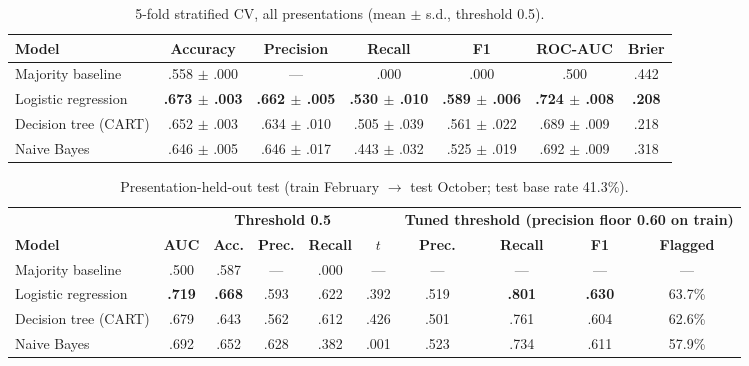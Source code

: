 \documentclass[10pt,letterpaper]{article}
\begin{document}
\begin{table}[H]\centering\small
\caption{5-fold stratified CV, all presentations (mean $\pm$ s.d., threshold 0.5).}\label{tab:cv}
\begin{tabular}{@{}lcccccc@{}}
\toprule
\textbf{Model} & \textbf{Accuracy} & \textbf{Precision} & \textbf{Recall} & \textbf{F1} & \textbf{ROC-AUC} & \textbf{Brier} \\ \midrule
Majority baseline & .558 $\pm$ .000 & --- & .000 & .000 & .500 & .442 \\
Logistic regression & \textbf{.673 $\pm$ .003} & \textbf{.662 $\pm$ .005} & \textbf{.530 $\pm$ .010} & \textbf{.589 $\pm$ .006} & \textbf{.724 $\pm$ .008} & \textbf{.208} \\
Decision tree (CART) & .652 $\pm$ .003 & .634 $\pm$ .010 & .505 $\pm$ .039 & .561 $\pm$ .022 & .689 $\pm$ .009 & .218 \\
Naive Bayes & .646 $\pm$ .005 & .646 $\pm$ .017 & .443 $\pm$ .032 & .525 $\pm$ .019 & .692 $\pm$ .009 & .318 \\
\bottomrule
\end{tabular}
\end{table}

\begin{table}[H]\centering\small
\caption{Presentation-held-out test (train February $\rightarrow$ test October; test base rate 41.3\%).}\label{tab:ho}
\begin{tabular}{@{}l c ccc c cccc@{}}
\toprule
& & \multicolumn{3}{c}{\textbf{Threshold 0.5}} & & \multicolumn{4}{c}{\textbf{Tuned threshold (precision floor 0.60 on train)}} \\
\cmidrule(lr){3-5}\cmidrule(l){7-10}
\textbf{Model} & \textbf{AUC} & \textbf{Acc.} & \textbf{Prec.} & \textbf{Recall} & \textbf{$t$} & \textbf{Prec.} & \textbf{Recall} & \textbf{F1} & \textbf{Flagged} \\ \midrule
Majority baseline & .500 & .587 & --- & .000 & --- & --- & --- & --- & --- \\
Logistic regression & \textbf{.719} & \textbf{.668} & .593 & .622 & .392 & .519 & \textbf{.801} & \textbf{.630} & 63.7\% \\
Decision tree (CART) & .679 & .643 & .562 & .612 & .426 & .501 & .761 & .604 & 62.6\% \\
Naive Bayes & .692 & .652 & .628 & .382 & .001 & .523 & .734 & .611 & 57.9\% \\
\bottomrule
\end{tabular}
\end{table}
\end{document}
